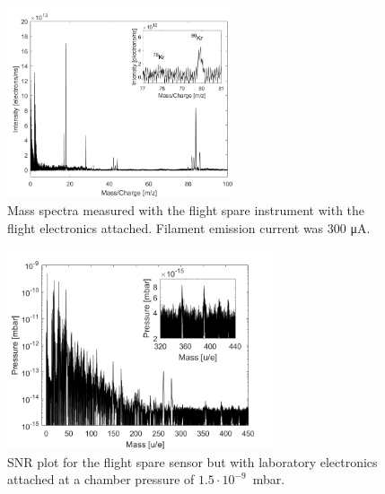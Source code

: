 		\begin{figure} %
			\centering
			\includegraphics[width = 0.6\textwidth]{Experiments/FS_thMode300uA.png}
			\caption{Mass spectra measured with the flight spare instrument with the flight electronics attached. Filament emission current was 300 \si{\micro\ampere}.}
			\label{fig:ExpFSFlightElK78}
		\end{figure}
		
		\begin{figure}[h]
			\centering
			\includegraphics[width = 0.7\textwidth]{Experiments/FSLabSNRRestGasPressCal.png}
			\caption{SNR plot for the flight spare sensor but with laboratory electronics attached at a chamber pressure of $1.5\cdot10^{-9}$\, mbar.}
			\label{fig:ExpFSFlightSenSNR}
		\end{figure}
	
	
	
	
	
	
	